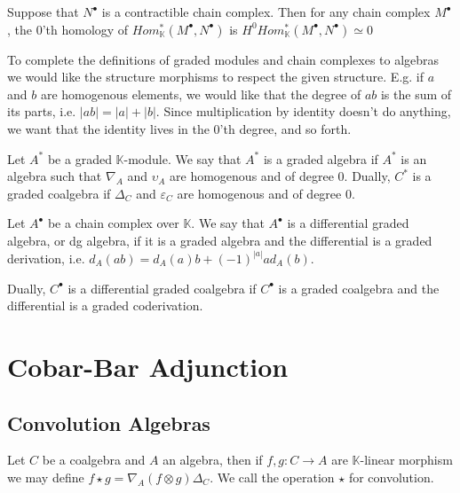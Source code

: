 \documentclass[../thesis.tex]{subfiles}
\begin{document}
            \begin{lemma}
                Suppose that $N^\bullet$ is a contractible chain complex. Then for any chain complex $M^\bullet$, the $0$'th homology of $Hom^*_\mathbb{K}(M^\bullet, N^\bullet)$ is $H^0Hom^*_\mathbb{K}(M^\bullet, N^\bullet)\simeq 0$
            \end{lemma}

            To complete the definitions of graded modules and chain complexes to algebras we would like the structure morphisms to respect the given structure. E.g. if $a$ and $b$ are homogenous elements, we would like that the degree of $ab$ is the sum of its parts, i.e. $|ab| = |a| + |b|$. Since multiplication by identity doesn't do anything, we want that the identity lives in the $0$'th degree, and so forth.

            \begin{definition}
                Let $A^*$ be a graded $\mathbb{K}$-module. We say that $A^*$ is a graded algebra if $A^*$ is an algebra such that $\nabla_A$ and $\upsilon_A$ are homogenous and of degree $0$.
                Dually, $C^*$ is a graded coalgebra if $\Delta_C$ and $\varepsilon_C$ are homogenous and of degree $0$.
            \end{definition}

            \begin{definition}
                Let $A^{\bullet}$ be a chain complex over $\mathbb{K}$. We say that $A^{\bullet}$ is a differential graded algebra, or dg algebra, if it is a graded algebra and the differential is a graded derivation, i.e. $d_A(ab) = d_A(a)b + (-1)^{|a|}ad_A(b)$.

                Dually, $C^{\bullet}$ is a differential graded coalgebra if $C^{\bullet}$ is a graded coalgebra and the differential is a graded coderivation.
            \end{definition}
    \section{Cobar-Bar Adjunction}
    \subsection{Convolution Algebras}

            Let $C$ be a coalgebra and $A$ an algebra, then if $f,g:C\rightarrow A$ are $\mathbb{K}$-linear morphism we may define $f\star g = \nabla_A(f\otimes g)\Delta_C$. We call the operation $\star$ for convolution.
\end{document}
